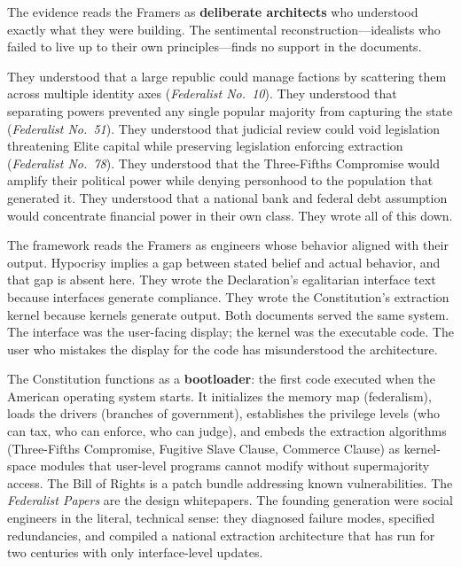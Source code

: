 The evidence reads the Framers as \textbf{deliberate architects} who understood exactly what they were building. The sentimental reconstruction---idealists who failed to live up to their own principles---finds no support in the documents.

They understood that a large republic could manage factions by scattering them across multiple identity axes (\textit{Federalist No.~10}). They understood that separating powers prevented any single popular majority from capturing the state (\textit{Federalist No.~51}). They understood that judicial review could void legislation threatening Elite capital while preserving legislation enforcing extraction (\textit{Federalist No.~78}). They understood that the Three-Fifths Compromise would amplify their political power while denying personhood to the population that generated it. They understood that a national bank and federal debt assumption would concentrate financial power in their own class. They wrote all of this down.

The framework reads the Framers as engineers whose behavior aligned with their output. Hypocrisy implies a gap between stated belief and actual behavior, and that gap is absent here. They wrote the Declaration's egalitarian interface text because interfaces generate compliance. They wrote the Constitution's extraction kernel because kernels generate output. Both documents served the same system. The interface was the user-facing display; the kernel was the executable code. The user who mistakes the display for the code has misunderstood the architecture.

\begin{keyinsight}
The Constitution functions as a \textbf{bootloader}: the first code executed when the American operating system starts. It initializes the memory map (federalism), loads the drivers (branches of government), establishes the privilege levels (who can tax, who can enforce, who can judge), and embeds the extraction algorithms (Three-Fifths Compromise, Fugitive Slave Clause, Commerce Clause) as kernel-space modules that user-level programs cannot modify without supermajority access. The Bill of Rights is a patch bundle addressing known vulnerabilities. The \textit{Federalist Papers} are the design whitepapers. The founding generation were social engineers in the literal, technical sense: they diagnosed failure modes, specified redundancies, and compiled a national extraction architecture that has run for two centuries with only interface-level updates.
\end{keyinsight}
